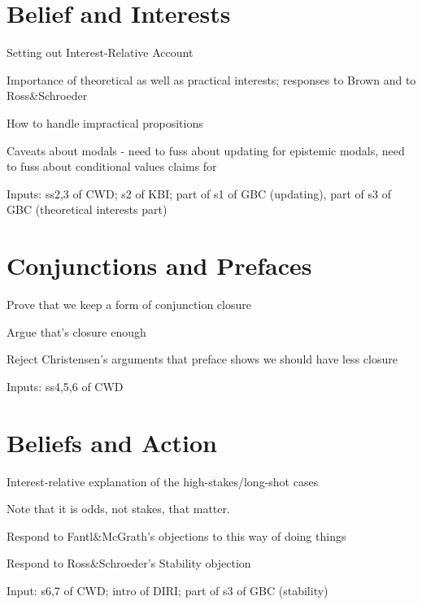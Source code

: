 \documentclass[11pt,oneside]{book}
\begin{document}
\section{Belief and Interests}
\label{beliefandinterests}

\begin{itemize*}
\item Setting out Interest-Relative Account

\item Importance of theoretical as well as practical interests; responses to Brown and to Ross\&Schroeder

\item How to handle impractical propositions

\item Caveats about modals - need to fuss about updating for epistemic modals, need to fuss about conditional values claims for

\end{itemize*}
Inputs: ss2,3 of CWD; s2 of KBI; part of s1 of GBC (updating), part of s3 of GBC (theoretical interests part)

\section{Conjunctions and Prefaces}
\label{conjunctionsandprefaces}

\begin{itemize*}
\item Prove that we keep a form of conjunction closure

\item Argue that's closure enough

\item Reject Christensen's arguments that preface shows we should have less closure

\end{itemize*}
Inputs: ss4,5,6 of CWD

\section{Beliefs and Action}
\label{beliefsandaction}

\begin{itemize*}
\item Interest-relative explanation of the high-stakes\slash long-shot cases

\item Note that it is odds, not stakes, that matter.

\item Respond to Fantl\&McGrath's objections to this way of doing things

\item Respond to Ross\&Schroeder's Stability objection
\end{itemize*}
Input: s6,7 of CWD; intro of DIRI; part of s3 of GBC (stability)
\end{document}
